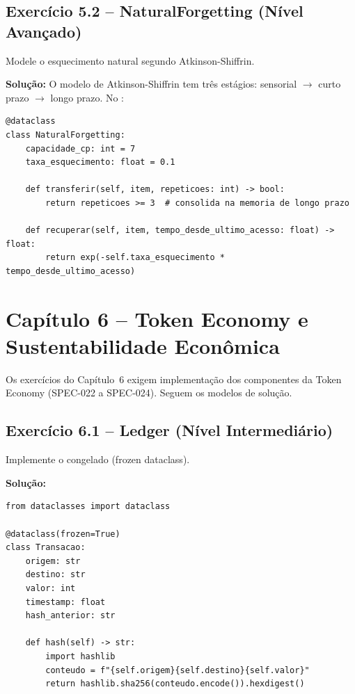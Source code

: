 \subsection*{Exercício 5.2 -- NaturalForgetting (Nível Avançado)}
Modele o esquecimento natural segundo Atkinson-Shiffrin.

\textbf{Solução:} O modelo de Atkinson-Shiffrin tem três estágios:
sensorial $\to$ curto prazo $\to$ longo prazo. No \opencodeeco{}:
\begin{lstlisting}[style=pythonstyle]
@dataclass
class NaturalForgetting:
    capacidade_cp: int = 7
    taxa_esquecimento: float = 0.1

    def transferir(self, item, repeticoes: int) -> bool:
        return repeticoes >= 3  # consolida na memoria de longo prazo

    def recuperar(self, item, tempo_desde_ultimo_acesso: float) -> float:
        return exp(-self.taxa_esquecimento * tempo_desde_ultimo_acesso)
\end{lstlisting}

\section*{Capítulo 6 -- Token Economy e Sustentabilidade Econômica}

Os exercícios do Capítulo~6 exigem implementação dos componentes da
Token Economy (SPEC-022 a SPEC-024). Seguem os modelos de solução.

\subsection*{Exercício 6.1 -- Ledger (Nível Intermediário)}
Implemente o  congelado (frozen dataclass).

\textbf{Solução:}
\begin{lstlisting}[style=pythonstyle]
from dataclasses import dataclass

@dataclass(frozen=True)
class Transacao:
    origem: str
    destino: str
    valor: int
    timestamp: float
    hash_anterior: str

    def hash(self) -> str:
        import hashlib
        conteudo = f"{self.origem}{self.destino}{self.valor}"
        return hashlib.sha256(conteudo.encode()).hexdigest()
\end{lstlisting}

